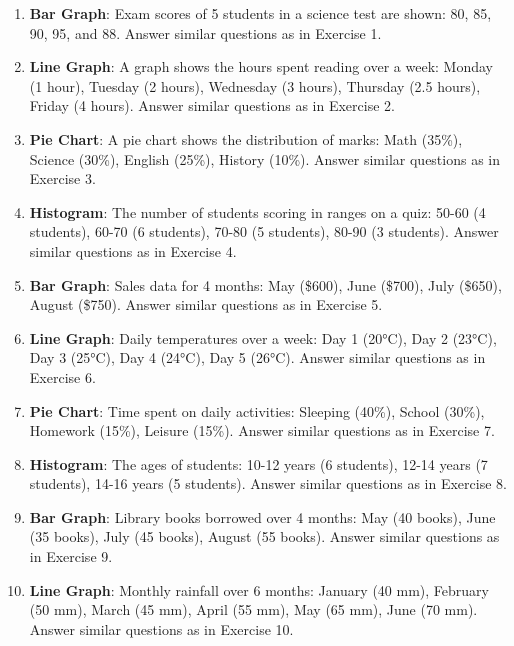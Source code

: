 \begin{enumerate}
    \item \textbf{Bar Graph}: Exam scores of 5 students in a science test are shown: 80, 85, 90, 95, and 88. Answer similar questions as in Exercise 1.
    \item \textbf{Line Graph}: A graph shows the hours spent reading over a week: Monday (1 hour), Tuesday (2 hours), Wednesday (3 hours), Thursday (2.5 hours), Friday (4 hours). Answer similar questions as in Exercise 2.
    \item \textbf{Pie Chart}: A pie chart shows the distribution of marks: Math (35\%), Science (30\%), English (25\%), History (10\%). Answer similar questions as in Exercise 3.
    \item \textbf{Histogram}: The number of students scoring in ranges on a quiz: 50-60 (4 students), 60-70 (6 students), 70-80 (5 students), 80-90 (3 students). Answer similar questions as in Exercise 4.
    \item \textbf{Bar Graph}: Sales data for 4 months: May (\$600), June (\$700), July (\$650), August (\$750). Answer similar questions as in Exercise 5.
    \item \textbf{Line Graph}: Daily temperatures over a week: Day 1 (20°C), Day 2 (23°C), Day 3 (25°C), Day 4 (24°C), Day 5 (26°C). Answer similar questions as in Exercise 6.
    \item \textbf{Pie Chart}: Time spent on daily activities: Sleeping (40\%), School (30\%), Homework (15\%), Leisure (15\%). Answer similar questions as in Exercise 7.
    \item \textbf{Histogram}: The ages of students: 10-12 years (6 students), 12-14 years (7 students), 14-16 years (5 students). Answer similar questions as in Exercise 8.
    \item \textbf{Bar Graph}: Library books borrowed over 4 months: May (40 books), June (35 books), July (45 books), August (55 books). Answer similar questions as in Exercise 9.
    \item \textbf{Line Graph}: Monthly rainfall over 6 months: January (40 mm), February (50 mm), March (45 mm), April (55 mm), May (65 mm), June (70 mm). Answer similar questions as in Exercise 10.
\end{enumerate}


